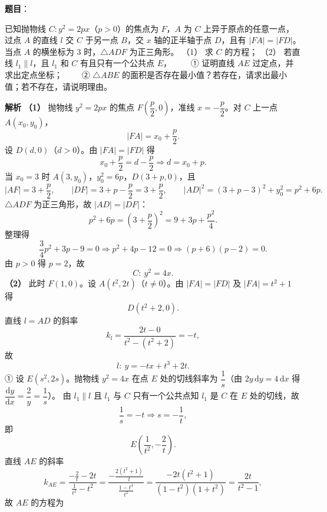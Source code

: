 \begin{answer}

\textbf{题目}：

已知抛物线 $C:y^2=2px$（$p>0$）的焦点为 $F$，$A$ 为 $C$ 上异于原点的任意一点，过点 $A$ 的直线 $l$ 交 $C$ 于另一点 $B$，交 $x$ 轴的正半轴于点 $D$，且有 $|FA|=|FD|$。当点 $A$ 的横坐标为 $3$ 时，$\triangle ADF$ 为正三角形。
（1） 求 $C$ 的方程；
（2） 若直线 $l_1\parallel l$，且 $l_1$ 和 $C$ 有且只有一个公共点 $E$，
　　① 证明直线 $AE$ 过定点，并求出定点坐标；
　　② $\triangle ABE$ 的面积是否存在最小值？若存在，请求出最小值；若不存在，请说明理由。

\textbf{解析}
\textbf{（1）} 抛物线 $y^2=2px$ 的焦点 $F\left(\dfrac p2,0\right)$，准线 $x=-\dfrac p2$。对 $C$ 上一点 $A(x_0,y_0)$，
\nopagebreak[4]
\[|FA|=x_0+\frac p2 .\]
设 $D(d,0)$（$d>0$）。由 $|FA|=|FD|$ 得
\nopagebreak[4]
\[x_0+\frac p2=d-\frac p2\Longrightarrow d=x_0+p .\]
当 $x_0=3$ 时 $A(3,y_0)$，$y_0^2=6p$，$D(3+p,0)$，且
\nopagebreak[4]
\[|AF|=3+\frac p2,\qquad |DF|=3+p-\frac p2=3+\frac p2,\qquad
|AD|^2=(3+p-3)^2+y_0^2=p^2+6p .\]
$\triangle ADF$ 为正三角形，故 $|AD|=|DF|$：
\nopagebreak[4]
\[p^2+6p=\left(3+\frac p2\right)^2=9+3p+\frac{p^2}4 .\]
整理得
\nopagebreak[4]
\[\frac34p^2+3p-9=0\Longrightarrow p^2+4p-12=0\Longrightarrow(p+6)(p-2)=0 .\]
由 $p>0$ 得 $p=2$，故
\nopagebreak[4]
\[C:\ y^2=4x .\]
\textbf{（2）} 此时 $F(1,0)$。设 $A\left(t^2,2t\right)$（$t\neq0$）。由 $|FA|=|FD|$ 及 $|FA|=t^2+1$ 得
\nopagebreak[4]
\[D\left(t^2+2,0\right).\]
直线 $l=AD$ 的斜率
\nopagebreak[4]
\[k_l=\frac{2t-0}{t^2-(t^2+2)}=-t,\]
故
\nopagebreak[4]
\[l:\ y=-tx+t^3+2t .\]
① 设 $E\left(s^2,2s\right)$。抛物线 $y^2=4x$ 在点 $E$ 处的切线斜率为 $\dfrac1s$（由 $2y\,\mathrm dy=4\,\mathrm dx$ 得 $\dfrac{\mathrm dy}{\mathrm dx}=\dfrac2y=\dfrac1s$）。
由 $l_1\parallel l$ 且 $l_1$ 与 $C$ 只有一个公共点知 $l_1$ 是 $C$ 在 $E$ 处的切线，故
\nopagebreak[4]
\[\frac1s=-t\Longrightarrow s=-\frac1t,\]
即
\nopagebreak[4]
\[E\left(\frac1{t^2},-\frac2t\right).\]
直线 $AE$ 的斜率
\nopagebreak[4]
\[k_{AE}=\frac{-\frac2t-2t}{\frac1{t^2}-t^2}
=\frac{-\frac{2(t^2+1)}t}{\frac{1-t^4}{t^2}}
=\frac{-2t(t^2+1)}{(1-t^2)(1+t^2)}
=\frac{2t}{t^2-1},\]
故 $AE$ 的方程为
\nopagebreak[4]

\end{answer}
